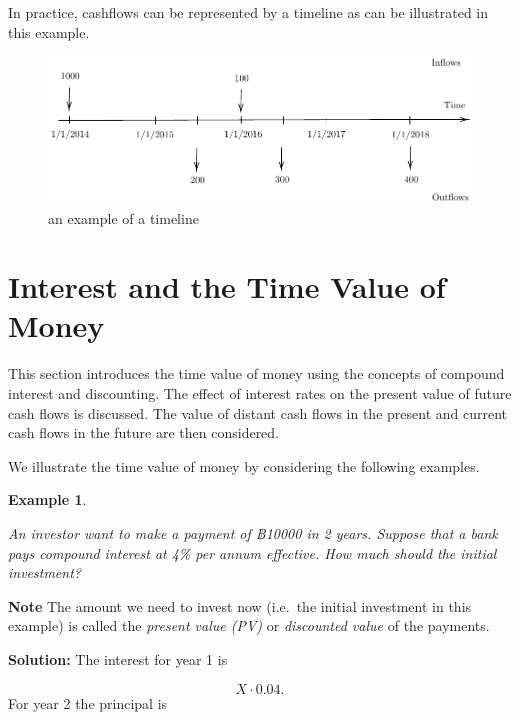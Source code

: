 \documentclass[landscape, 20pt]{extreport}
\theoremstyle{definition}
\theoremstyle{definition}
\newtheorem{example}{Example}[chapter]
\theoremstyle{definition}
\theoremstyle{definition}
\theoremstyle{remark}
\begin{document}
In practice, cashflows can be represented by a timeline as can be
illustrated in this example.

\begin{figure}

{\centering \includegraphics{tikz-ex1-1} 

}

\caption{an example of a timeline}\label{fig:tikz-ex1}
\end{figure}

\hypertarget{interest-and-the-time-value-of-money}{%
\newpage \section{Interest and the Time Value of Money}\label{interest-and-the-time-value-of-money}}

This section introduces the time value of money using the concepts of
compound interest and discounting. The effect of interest rates on the
present value of future cash flows is discussed. The value of distant
cash flows in the present and current cash flows in the future are then
considered.

We illustrate the time value of money by considering the following
examples.

\newpage \begin{example}
\protect\hypertarget{exm:egpv}{}\label{exm:egpv}

\emph{An investor want to make a payment of ฿10000 in 2 years. Suppose that a
bank pays compound interest at 4\% per annum effective. How much should
the initial investment?}

\end{example}

\textbf{Note} The amount we need to invest now (i.e.~the initial investment
in this example) is called the \emph{present value (PV)} or \emph{discounted
value} of the payments.

\textbf{Solution:} The interest for year 1 is

\[ X \cdot 0.04.\] For year 2 the principal is
\end{document}
